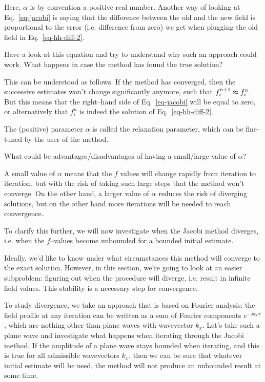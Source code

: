Here, $\alpha$ is by convention a positive real number. Another way of looking at Eq.~\ref{eq-jacobi} is saying that the difference between the old and the new field is proportional to the error (i.e. difference from zero) we get when plugging the old field in Eq.~\ref{eq-hh-diff-2}.

\begin{cue}
Have a look at this equation and try to understand why such an approach could work. What happens in case the method has found the true solution?  
\end{cue}

This can be understood as follows. If the method has converged, then the successive estimates won't change significantly anymore, such that $ f_i^{n+1} \thickapprox f_i^n $. But this means that the right--hand side of Eq.~\ref{eq-jacobi} will be equal to zero, or alternatively that $f_i^n$ is indeed the solution of Eq.~\ref{eq-hh-diff-2}.

The (positive) parameter $\alpha$ is called the relaxation parameter, which can be fine--tuned by the user of the method.

\begin{cue}
What could be advantages/disadvantages of having a small/large value of $\alpha$? 
\end{cue}

A small value of $\alpha$ means that the $f$ values will change rapidly from iteration to iteration, but with the risk of taking such large steps that the method won't converge. On the other hand, a larger value of $\alpha$ reduces the risk of diverging solutions, but on the other hand more iterations will be needed to reach convergence.

To clarify this further, we will now investigate when the Jacobi method diverges, i.e. when the $f$--values become unbounded for a bounded initial estimate.


Ideally, we'd like to know under what circumstances this method will converge to the exact solution. However, in this section, we're going to look at an easier subproblem: figuring out when the procedure will diverge, i.e. result in infinite field values. This stability is a necessary step for convergence.

To study divergence, we take an approach that is based on Fourier analysis: the field profile at any iteration can be written as a sum of Fourier components $e^{-j k_x x}$, which are nothing other than plane waves with wavevector $k_x$. Let's take such a plane wave and investigate what happens when iterating through the Jacobi method. If the amplitude of a plane wave stays bounded when iterating, and this is true for all admissible wavevectors $k_x$, then we can be sure that whatever initial estimate will be used, the method will not produce an unbounded result at some time.

